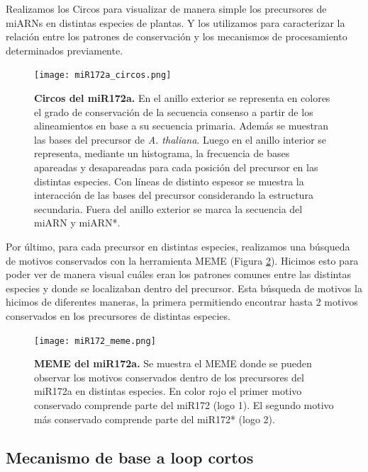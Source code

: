 Realizamos los Circos para visualizar de manera simple los precursores de miARNs en distintas especies de plantas.
Y los utilizamos para caracterizar la relación entre los patrones de conservación y los mecanismos de procesamiento determinados previamente.


\begin{figure}[htbp!] 
    \centering    
    \texttt{[image: miR172a\_circos.png]}
    \caption[Circos del miR172a]{
    \textbf{Circos del miR172a.}
En el anillo exterior se representa en colores el grado de conservación de la secuencia consenso a partir de los alineamientos en base a su secuencia primaria.
Además se muestran las bases del precursor de \textit {A. thaliana}.
Luego en el anillo interior se representa, mediante un histograma, la frecuencia de bases apareadas y desapareadas para cada posición del precursor en las distintas especies.
Con líneas de distinto espesor se muestra la interacción de las bases del precursor considerando la estructura secundaria. 
Fuera del anillo exterior se marca la secuencia del miARN y miARN*.
   }
     \label{fig:miR172a_circos}
\end{figure}

Por último, para cada precursor en distintas especies, realizamos una búsqueda de motivos conservados con la herramienta MEME \citep{pmid22115189} (Figura \ref{fig:miR172_meme}).
Hicimos esto para poder ver de manera visual cuáles eran los patrones comunes entre las distintas especies y donde se localizaban dentro del precursor.
Esta búsqueda de motivos la hicimos de diferentes maneras, la primera permitiendo encontrar hasta 2 motivos conservados en los precursores de distintas especies.


\begin{landscape}
    \begin{figure}[htbp!] 
        \centering    
        \texttt{[image: miR172\_meme.png]}
        \caption[MEME del miR172a]{
			\textbf{MEME del miR172a.}
        Se muestra el MEME donde se pueden observar los motivos conservados dentro de los precursores del miR172a en distintas especies.
        En color rojo el primer motivo conservado comprende parte del miR172 (logo 1).
        El segundo motivo más conservado comprende parte del miR172* (logo 2).
        }
        \label{fig:miR172_meme}
    \end{figure}
\end{landscape}

\subsection{Mecanismo de base a loop cortos}

